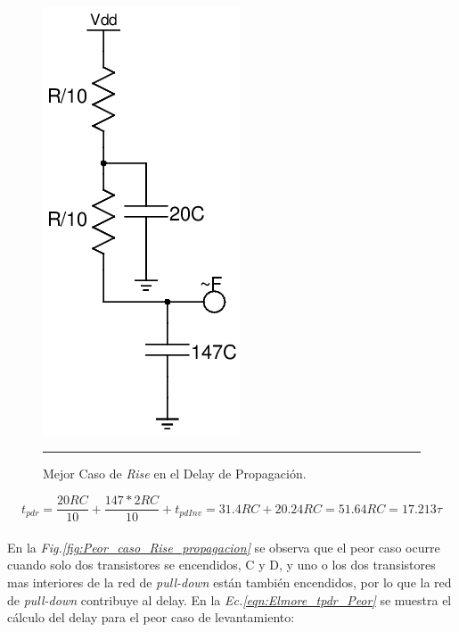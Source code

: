 \documentclass[12pt,a4paper]{article} %
\begin{document}
\begin{figure}[htbp]
  \centering
    \includegraphics[scale=0.5]{./Mejor_caso_Rise_propagacion.png}
    \rule{35em}{0.5pt}
  \caption[IdealvsSim]{Mejor Caso de \textit{Rise} en el Delay de Propagación.}
  \label{fig:Mejor_caso_Rise_propagacion}
\end{figure}

\begin{equation}\label{eqn:Elmore_tpdr_Mejor}
t_{pdr} = \frac{20RC}{10} + \frac{147*2RC}{10} + t_{pdInv}= 31.4RC + 20.24RC = 51.64RC = 17.213\tau
\end{equation}\\

En la \textit{Fig.\ref{fig:Peor_caso_Rise_propagacion}} se observa que el peor caso ocurre cuando solo dos transistores se encendidos, C y D, y uno o los dos transistores mas interiores de la red de \textit{pull-down} están también encendidos, por lo que la red de \textit{pull-down} contribuye al delay. En la \textit{Ec.\ref{eqn:Elmore_tpdr_Peor}} se muestra el cálculo del delay para el peor caso de levantamiento:\\
\end{document}
